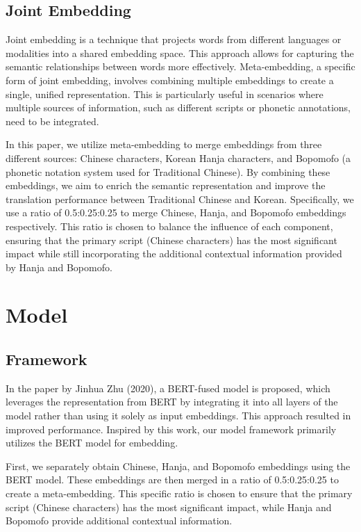 \documentclass[PhD]{PHlab-thesis}
\begin{document}
\subsection{Joint Embedding}
Joint embedding is a technique that projects words from different languages or modalities into a shared embedding space. This approach allows for capturing the semantic relationships between words more effectively. Meta-embedding\cite{kiela-etal-2018-dynamic}, a specific form of joint embedding, involves combining multiple embeddings to create a single, unified representation. This is particularly useful in scenarios where multiple sources of information, such as different scripts or phonetic annotations, need to be integrated.

In this paper, we utilize meta-embedding to merge embeddings from three different sources: Chinese characters, Korean Hanja characters, and Bopomofo (a phonetic notation system used for Traditional Chinese). By combining these embeddings, we aim to enrich the semantic representation and improve the translation performance between Traditional Chinese and Korean. Specifically, we use a ratio of 0.5:0.25:0.25 to merge Chinese, Hanja, and Bopomofo embeddings respectively. This ratio is chosen to balance the influence of each component, ensuring that the primary script (Chinese characters) has the most significant impact while still incorporating the additional contextual information provided by Hanja and Bopomofo.

\section{Model}

\subsection{Framework}
In the paper by Jinhua Zhu (2020)\cite{zhu2020incorporating}, a BERT-fused model is proposed, which leverages the representation from BERT by integrating it into all layers of the model rather than using it solely as input embeddings. This approach resulted in improved performance. Inspired by this work, our model framework primarily utilizes the BERT model for embedding.

First, we separately obtain Chinese, Hanja, and Bopomofo embeddings using the BERT model. These embeddings are then merged in a ratio of 0.5:0.25:0.25 to create a meta-embedding. This specific ratio is chosen to ensure that the primary script (Chinese characters) has the most significant impact, while Hanja and Bopomofo provide additional contextual information.
\end{document}

